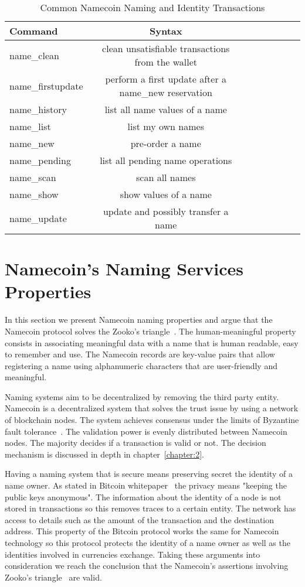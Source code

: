 \begin{center}
	\begin{table}[htb]
		\centering
		\caption{Common Namecoin Naming and Identity Transactions}
		\begin{tabular}{l*{6}{c}r}
			Command & Syntax\\
			\hline
			name_clean & clean unsatisfiable transactions from the wallet\\
			name_firstupdate & perform a first update after a name_new reservation\\
			name_history & list all name values of a name\\
			name_list & list my own names\\
			name_new & pre-order a name \\
			name_pending & list all pending name operations\\
			name_scan & scan all names \\
			name_show & show values of a name\\
			name_update & update and possibly transfer a name
		\end{tabular}
		\label{table:common-nmc-cmd}
	\end{table}
\end{center}

\section{Namecoin's Naming Services Properties}
\label{nmc-ns-prop-lbl}
In this section we present Namecoin naming properties and argue that the Namecoin protocol solves the Zooko's triangle~\cite{wilcox2001names}.
The human-meaningful property consists in associating meaningful data with a name that is human readable, easy to remember and use. The Namecoin records are key-value pairs that allow registering a name using alphanumeric characters that are user-friendly and meaningful.

Naming systems aim to be decentralized by removing the third party entity. Namecoin is a decentralized system that solves the trust issue by using a network of blockchain nodes. The system achieves consensus under the limits of Byzantine fault tolerance~\cite{bft}. The validation power is evenly distributed between Namecoin nodes. The majority decides if a transaction is valid or not. The decision mechanism is discussed in depth in chapter~\ref{chapter:2}.

Having a naming system that is secure means preserving secret the identity of a  name owner.
As stated in Bitcoin whitepaper~\cite{bitcoinwhitepaper} the privacy means "keeping the public keys anonymous". The information about the identity of a node is not stored in transactions so this removes traces to a certain entity. The network has access to details such as the amount of the transaction and the destination address. This property of the Bitcoin protocol works the same for Namecoin technology so this protocol protects the identity of a name owner as well as the identities involved in currencies exchange.
Taking these arguments into consideration we reach the conclusion that the Namecoin's assertions involving Zooko's triangle~\cite{wilcox2001names} are valid.


